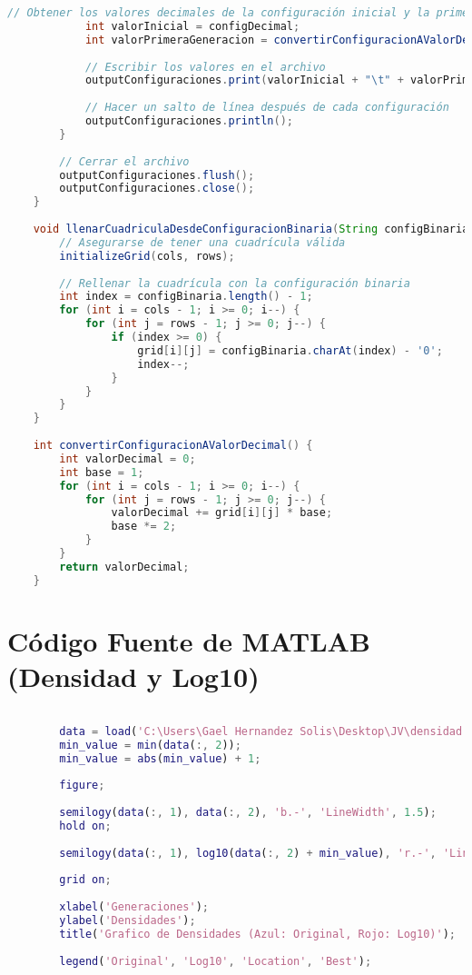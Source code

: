 \documentclass{article}
\begin{document}
\begin{lstlisting}[language=Java, basicstyle=\tiny, breaklines=true, breakatwhitespace=true]
 			// Obtener los valores decimales de la configuración inicial y la primera generación
 			int valorInicial = configDecimal;
 			int valorPrimeraGeneracion = convertirConfiguracionAValorDecimal();
 			
 			// Escribir los valores en el archivo
 			outputConfiguraciones.print(valorInicial + "\t" + valorPrimeraGeneracion);
 			
 			// Hacer un salto de línea después de cada configuración
 			outputConfiguraciones.println();
 		}
 		
 		// Cerrar el archivo
 		outputConfiguraciones.flush();
 		outputConfiguraciones.close();
 	}
 	
 	void llenarCuadriculaDesdeConfiguracionBinaria(String configBinaria) {
 		// Asegurarse de tener una cuadrícula válida
 		initializeGrid(cols, rows);
 		
 		// Rellenar la cuadrícula con la configuración binaria
 		int index = configBinaria.length() - 1;
 		for (int i = cols - 1; i >= 0; i--) {
 			for (int j = rows - 1; j >= 0; j--) {
 				if (index >= 0) {
 					grid[i][j] = configBinaria.charAt(index) - '0';
 					index--;
 				}
 			}
 		}
 	}
 	
 	int convertirConfiguracionAValorDecimal() {
 		int valorDecimal = 0;
 		int base = 1;
 		for (int i = cols - 1; i >= 0; i--) {
 			for (int j = rows - 1; j >= 0; j--) {
 				valorDecimal += grid[i][j] * base;
 				base *= 2;
 			}
 		}
 		return valorDecimal;
 	}
 		\end{lstlisting}
 		
 	\section{Código Fuente de MATLAB (Densidad y Log10)}
 	\begin{lstlisting}[language=Matlab, basicstyle=\tiny, breaklines=true, breakatwhitespace=true]
 		
 		data = load('C:\Users\Gael Hernandez Solis\Desktop\JV\densidad.txt');
 		min_value = min(data(:, 2));
 		min_value = abs(min_value) + 1;
 		
 		figure;
 		
 		semilogy(data(:, 1), data(:, 2), 'b.-', 'LineWidth', 1.5); 
 		hold on;
 		
 		semilogy(data(:, 1), log10(data(:, 2) + min_value), 'r.-', 'LineWidth', 1.5); 
 		
 		grid on;
 		
 		xlabel('Generaciones');
 		ylabel('Densidades');
 		title('Grafico de Densidades (Azul: Original, Rojo: Log10)');
 		
 		legend('Original', 'Log10', 'Location', 'Best');	
 		
 	\end{lstlisting}	
 		
\end{document}
